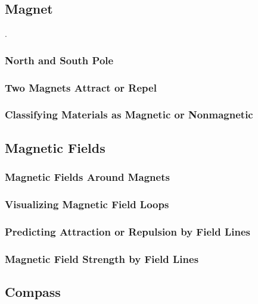 \documentclass[../main-physics-problems.tex]{subfiles}
\begin{document}
\subsection{Magnet}
    
\begin{questions}

\question
.

\end{questions}

\subsubsection{North and South Pole}

\subsubsection{Two Magnets Attract or Repel}

\subsubsection{Classifying Materials as Magnetic or Nonmagnetic}

\subsection{Magnetic Fields}

\subsubsection{Magnetic Fields Around Magnets}

\subsubsection{Visualizing Magnetic Field Loops}

\subsubsection{Predicting Attraction or Repulsion by Field Lines}

\subsubsection{Magnetic Field Strength by Field Lines}

\subsection{Compass}
\end{document}

